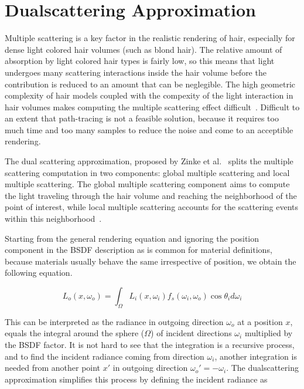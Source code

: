 \section{Dualscattering Approximation}
\label{sec_dualscattering}

Multiple scattering is a key factor in the realistic rendering of hair, especially for dense light colored hair volumes (such as blond hair). The relative amount of absorption by light colored hair types is fairly low, so this means that light undergoes many scattering interactions inside the hair volume before the contribution is reduced to an amount that can be neglegible. The high geometric complexity of hair models coupled with the compexity of the light interaction in hair volumes makes computing the multiple scattering effect difficult~\cite{zinke}. Difficult to an extent that path-tracing is not a feasible solution, because it requires too much time and too many samples to reduce the noise and come to an acceptible rendering.

The dual scattering approximation, proposed by Zinke et al.~\cite{zinke} splits the multiple scattering computation in two components: global multiple scattering and local multiple scattering. The global multiple scattering component aims to compute the light traveling through the hair volume and reaching the neighborhood of the point of interest, while local multiple scattering accounts for the scattering events within this neighborhood~\cite{zinke}.

%
%

Starting from the general rendering equation
and ignoring the position component in the BSDF description as is common for material definitions, because materials usually behave the same irrespective of position, we obtain the following equation.

\begin{equation}
L_o(x, \omega_o) = \int_{\Omega} L_i(x, \omega_i) f_s(\omega_i, \omega_o) \cos \theta_i d\omega_i
\end{equation}

This can be interpreted as the radiance in outgoing direction $\omega_o$ at a position $x$, equals the integral around the sphere ($\Omega$) of incident directions $\omega_i$ multiplied by the BSDF factor. It is not hard to see that the integration is a recursive process, and to find the incident radiance coming from direction $\omega_i$, another integration is needed from another point $x'$ in outgoing direction $\omega_o' = -\omega_i$. The dualscattering approximation simplifies this process by defining the incident radiance as


